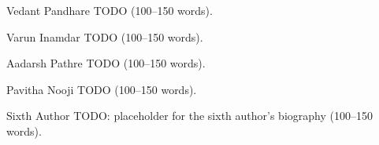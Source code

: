 \documentclass{ieeeaccess}
\begin{document}
\begin{IEEEbiographynophoto}{Vedant Pandhare}
TODO (100--150 words).
\end{IEEEbiographynophoto}

\begin{IEEEbiographynophoto}{Varun Inamdar}
TODO (100--150 words).
\end{IEEEbiographynophoto}

\begin{IEEEbiographynophoto}{Aadarsh Pathre}
TODO (100--150 words).
\end{IEEEbiographynophoto}

\begin{IEEEbiographynophoto}{Pavitha Nooji}
TODO (100--150 words).
\end{IEEEbiographynophoto}

\begin{IEEEbiographynophoto}{Sixth Author}
TODO: placeholder for the sixth author's biography (100--150 words).
\end{IEEEbiographynophoto}

\EOD
\end{document}
